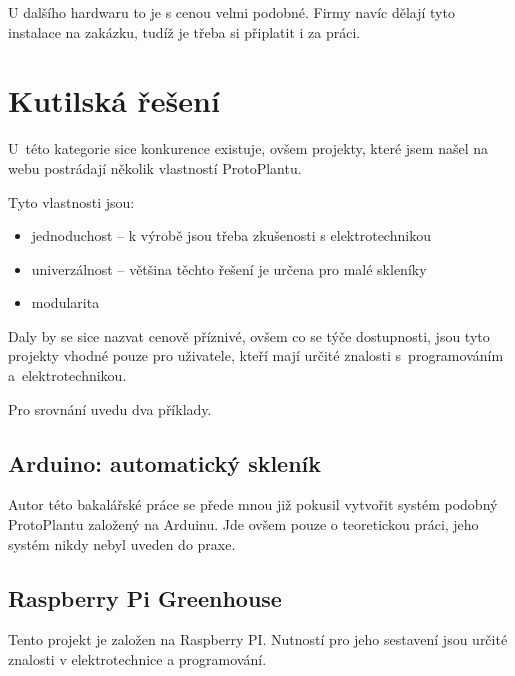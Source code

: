 U dalšího hardwaru to je s cenou velmi podobné.
Firmy navíc dělají tyto instalace na zakázku, tudíž je třeba si připlatit i za práci.

\section{Kutilská řešení}
U~této kategorie sice konkurence existuje, ovšem projekty, které jsem našel na webu postrádají několik vlastností ProtoPlantu.

Tyto vlastnosti jsou:
\begin{itemize}
    \item jednoduchost -- k výrobě jsou třeba zkušenosti s elektrotechnikou
    \item univerzálnost -- většina těchto řešení je určena pro malé skleníky
    \item modularita
\end{itemize}

Daly by se sice nazvat cenově příznivé, ovšem co se týče dostupnosti, jsou tyto projekty vhodné pouze pro uživatele, kteří mají určité znalosti s~programováním a~elektrotechnikou.

Pro srovnání uvedu dva příklady.
\subsection{Arduino: automatický skleník}
Autor této bakalářské práce \cite{sklenikVavra} se přede mnou již pokusil vytvořit systém podobný ProtoPlantu založený na Arduinu.
Jde ovšem pouze o teoretickou práci, jeho systém nikdy nebyl uveden do praxe.

\subsection{Raspberry Pi Greenhouse}
Tento projekt \cite{raspPIgreenhouse} je založen na Raspberry PI.
Nutností pro jeho sestavení jsou určité znalosti v elektrotechnice a programování.

